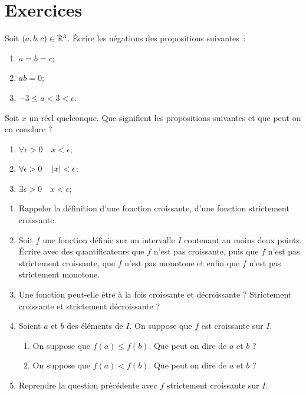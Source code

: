 \section{Exercices}
\begin{exercice}
    Soit \((a, b, c) \in \mathbb{R}^3\). Écrire les négations des propositions suivantes~:
    \begin{enumerate}
        \item \(a=b=c\);
        \item \(ab=0\);
        \item \(-3 \leqslant a < 3 < c\).
    \end{enumerate}
\end{exercice}
\begin{exercice}
    Soit \(x\) un réel quelconque. Que signifient les propositions suivantes et que
    peut on en conclure ?
    \begin{enumerate}
        \item \(\forall \epsilon>0 \quad x<\epsilon\);
        \item \(\forall \epsilon>0 \quad \left\lvert x\right\rvert<\epsilon\);
        \item \(\exists \epsilon>0 \quad x<\epsilon\);
    \end{enumerate}
\end{exercice}
\begin{exercice}
    \begin{enumerate}
        \item Rappeler la définition d'une fonction croissante, d'une fonction
            strictement croissante.
        \item Soit \(f\) une fonction définie sur un intervalle \(I\) contenant au
            moins deux points. Écrire avec des quantificateurs que \(f\) n'est pas
            croissante, puis que \(f\) n'est pas strictement croissante, que \(f\)
            n'est pas monotone et enfin que \(f\) n'est pas strictement monotone.
        \item Une fonction peut-elle être à la fois croissante et décroissante ?
            Strictement croissante et strictement décroissante ?
        \item Soient \(a\) et \(b\) des éléments de \(I\). On suppose que \(f\) est
            croissante sur \(I\).
            \begin{enumerate}
                \item On suppose que \(f(a) \leqslant f(b)\). Que peut on dire de \(a\)
                    et \(b\) ?
                \item On suppose que \(f(a) < f(b)\). Que peut on dire de \(a\) et \(b\)
                    ?
            \end{enumerate}
        \item Reprendre la question précédente avec \(f\) strictement croissante sur
            \(I\).
    \end{enumerate}
\end{exercice}
